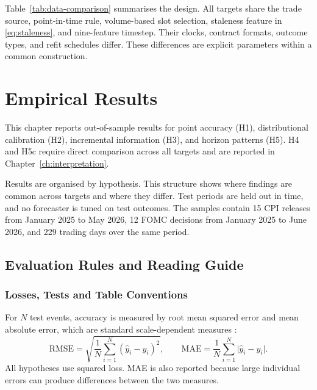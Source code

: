 \documentclass[12pt,a4paper]{report}
\begin{document}
Table~\ref{tab:data-comparison} summarises the design. All targets share the
trade source, point-in-time rule, volume-based slot selection, staleness
feature in \eqref{eq:staleness}, and nine-feature timestep. Their clocks,
contract formats, outcome types, and refit schedules differ. These differences
are explicit parameters within a common construction.

\chapter{Empirical Results}
\label{ch:results}

This chapter reports out-of-sample results for point accuracy (H1),
distributional calibration (H2), incremental information (H3), and horizon
patterns (H5). H4 and H5c require direct comparison across all targets and are
reported in Chapter~\ref{ch:interpretation}.

Results are organised by hypothesis. This structure shows where findings are
common across targets and where they differ. Test periods are held out in time,
and no forecaster is tuned on test outcomes. The samples contain 15 CPI
releases from January 2025 to May 2026, 12 FOMC decisions from January 2025 to
June 2026, and 229 trading days over the same period.


\section{Evaluation Rules and Reading Guide}
\label{sec:results-design}

\subsection{Losses, Tests and Table Conventions}
\label{sec:results-design-accuracy}

For $N$ test events, accuracy is measured by root mean squared error and mean
absolute error, which are standard scale-dependent measures
\parencite{hyndman2006}:
\begin{equation}
\mathrm{RMSE} = \sqrt{\frac{1}{N}\sum_{i=1}^{N}(\hat{y}_i - y_i)^2},
\qquad
\mathrm{MAE} = \frac{1}{N}\sum_{i=1}^{N}\bigl|\hat{y}_i - y_i\bigr| .
\label{eq:rmse}
\end{equation}
All hypotheses use squared loss. MAE is also reported because large individual
errors can produce differences between the two measures.
\end{document}

